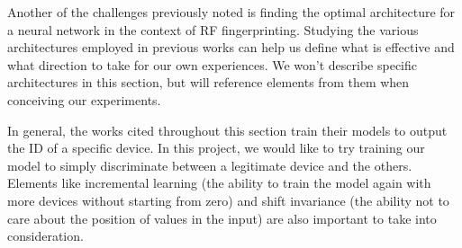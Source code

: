 Another of the challenges previously noted is finding the optimal architecture for a neural network in the context of RF fingerprinting. Studying the various architectures employed in previous works can help us define what is effective and what direction to take for our own experiences. We won't describe specific architectures in this section, but will reference elements from them when conceiving our experiments.

In general, the works cited throughout this section train their models to output the ID of a specific device. In this project, we would like to try training our model to simply discriminate between a legitimate device and the others. Elements like incremental learning (the ability to train the model again with more devices without starting from zero) and shift invariance (the ability not to care about the position of values in the input) are also important to take into consideration.
